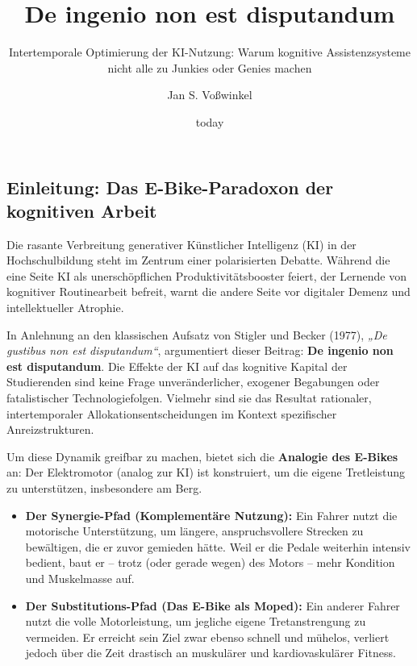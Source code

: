 \documentclass[
  ngerman,
  letterpaper,
  DIV=11]{scrartcl}
\title{De ingenio non est disputandum}
\subtitle{Intertemporale Optimierung der KI-Nutzung: Warum kognitive
Assistenzsysteme nicht alle zu Junkies oder Genies machen}
\author{Jan S. Voßwinkel}
\date{today}
\providecommand{\tightlist}{%
  \setlength{\itemsep}{0pt}\setlength{\parskip}{0pt}}
\renewcommand*\contentsname{Inhaltsverzeichnis}
\newcommand\contentsname{Inhaltsverzeichnis}
\begin{document}
\maketitle

\renewcommand*\contentsname{Inhaltsverzeichnis}
{
\hypersetup{linkcolor=}
\setcounter{tocdepth}{3}
\tableofcontents
}

\subsection{Einleitung: Das E-Bike-Paradoxon der kognitiven
Arbeit}\label{einleitung-das-e-bike-paradoxon-der-kognitiven-arbeit}

Die rasante Verbreitung generativer Künstlicher Intelligenz (KI) in der
Hochschulbildung steht im Zentrum einer polarisierten Debatte. Während
die eine Seite KI als unerschöpflichen Produktivitätsbooster feiert, der
Lernende von kognitiver Routinearbeit befreit, warnt die andere Seite
vor digitaler Demenz und intellektueller Atrophie.

In Anlehnung an den klassischen Aufsatz von Stigler und Becker (1977),
\emph{„De gustibus non est disputandum``}, argumentiert dieser Beitrag:
\textbf{De ingenio non est disputandum}. Die Effekte der KI auf das
kognitive Kapital der Studierenden sind keine Frage unveränderlicher,
exogener Begabungen oder fatalistischer Technologiefolgen. Vielmehr sind
sie das Resultat rationaler, intertemporaler Allokationsentscheidungen
im Kontext spezifischer Anreizstrukturen.

Um diese Dynamik greifbar zu machen, bietet sich die \textbf{Analogie
des E-Bikes} an: Der Elektromotor (analog zur KI) ist konstruiert, um
die eigene Tretleistung zu unterstützen, insbesondere am Berg.

\begin{itemize}
\tightlist
\item
  \textbf{Der Synergie-Pfad (Komplementäre Nutzung):} Ein Fahrer nutzt
  die motorische Unterstützung, um längere, anspruchsvollere Strecken zu
  bewältigen, die er zuvor gemieden hätte. Weil er die Pedale weiterhin
  intensiv bedient, baut er -- trotz (oder gerade wegen) des Motors --
  mehr Kondition und Muskelmasse auf.
\item
  \textbf{Der Substitutions-Pfad (Das E-Bike als Moped):} Ein anderer
  Fahrer nutzt die volle Motorleistung, um jegliche eigene
  Tretanstrengung zu vermeiden. Er erreicht sein Ziel zwar ebenso
  schnell und mühelos, verliert jedoch über die Zeit drastisch an
  muskulärer und kardiovaskulärer Fitness.
\end{itemize}
\end{document}
